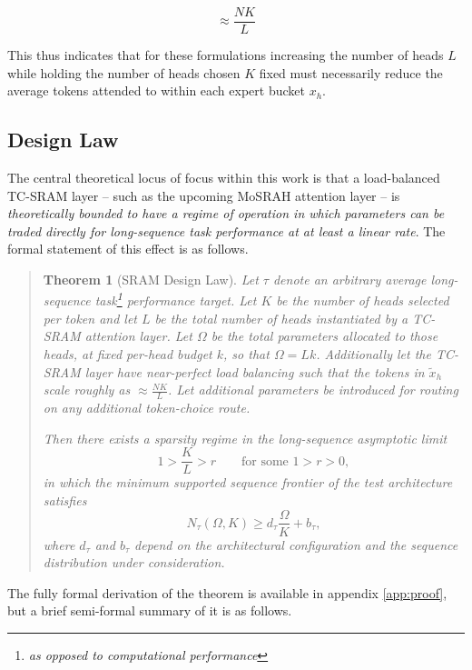 \documentclass[11pt]{article}
\newtheorem{theorem}{Theorem}
\begin{document}
\[
\approx \frac{NK}{L}
\]

This thus indicates that for these formulations increasing the number of heads $L$ while holding the number of heads chosen $K$ fixed must necessarily reduce the average tokens attended to within each expert bucket $x_h$.

\subsection{Design Law}

The central theoretical locus of focus within this work is that a load-balanced TC-SRAM layer -- such as the upcoming MoSRAH attention layer -- is \emph{theoretically bounded to have a regime of operation in which parameters can be traded directly for long-sequence task performance at at least a linear rate}. The formal statement of this effect is as follows.

\begin{quote}
\begin{theorem}[SRAM Design Law]
\label{theorem}
Let $\tau$ denote an arbitrary average long-sequence \emph{task}\footnote{as opposed to computational performance} performance target. Let $K$ be the number of heads selected per token and let $L$ be the total number of heads instantiated by a TC-SRAM attention layer. Let $\Omega$ be the total parameters allocated to those heads, at fixed per-head budget $k$, so that $\Omega=Lk$. Additionally let the TC-SRAM layer have near-perfect load balancing such that the tokens in $\tilde{x}_h$ scale roughly as $\approx \frac{NK}{L}$. Let additional parameters be introduced for routing on any additional token-choice route.

Then there exists a sparsity regime in the long-sequence asymptotic limit
\[
1 > \frac{K}{L} > r
\qquad\text{for some } 1>r>0,
\]
in which the minimum supported sequence frontier of the test architecture satisfies
\[
N_\tau(\Omega,K) \ge d_\tau \frac{\Omega}{K} + b_\tau,
\]
where $d_\tau$ and $b_\tau$ depend on the architectural configuration and the sequence distribution under consideration.
\end{theorem}
\end{quote}

The fully formal derivation of the theorem is available in appendix \ref{app:proof}, but a brief semi-formal summary of it is as follows.
\end{document}
